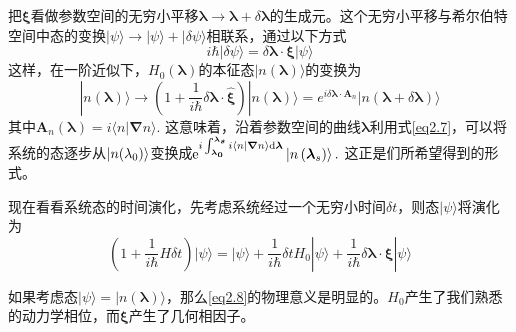 把$\boldsymbol{\xi}$看做参数空间的无穷小平移$\boldsymbol{\lambda} \to \boldsymbol{\lambda} + \delta \boldsymbol{\lambda}$的生成元。这个无穷小平移与希尔伯特空间中态的变换$|\psi\rangle \rightarrow|\psi\rangle+|\delta \psi\rangle$相联系，通过以下方式
\begin{equation}
    i \hbar|\delta \psi\rangle=\delta \boldsymbol{\lambda} \cdot \boldsymbol{\xi}|\psi\rangle
    \label{eq2.6}
\end{equation}
这样，在一阶近似下，$H_0 (\bm{\lambda})$的本征态$|n(\bm{\lambda})\rangle$的变换为
\begin{equation}
    |n(\boldsymbol{\lambda})\rangle \rightarrow\left(1+\frac{1}{i \hbar} \delta \boldsymbol{\lambda} \cdot \hat{\boldsymbol{\xi}}\right)|n(\boldsymbol{\lambda})\rangle=e^{i \delta \boldsymbol{\lambda} \cdot \boldsymbol{A}_{n}}|n(\boldsymbol{\lambda}+\delta \boldsymbol{\lambda})\rangle
    \label{eq2.7}
\end{equation}
其中$\boldsymbol{A}_{n}(\boldsymbol{\lambda})=i\langle n | \boldsymbol{\nabla} n\rangle.$ 这意味着，沿着参数空间的曲线$\bm{\lambda}$利用式\eqref{eq2.7}，可以将系统的态逐步从$|n(\mathrm{\lambda_0})\rangle$变换成$\mathrm{e}^{i \int_{\bm{\lambda_0}}^{\bm{\lambda_s}}   i\langle n | \boldsymbol{\nabla} n\rangle \mathrm{d}\bm{\lambda}}\left|n\left(\boldsymbol{\lambda}_{s}\right)\right\rangle.$ 这正是们所希望得到的形式。

现在看看系统态的时间演化，先考虑系统经过一个无穷小时间$\delta t$，则态$|\psi \rangle$将演化为
\begin{equation}
     \left(1+\frac{1}{i \hbar} H \delta t\right)|\psi\rangle=|\psi\rangle+\frac{1}{i \hbar} \delta t H_{0}|\psi\rangle+\frac{1}{i \hbar} \delta \boldsymbol{\lambda} \cdot \boldsymbol{\xi}|\psi\rangle
   \label{eq2.8}
\end{equation}

如果考虑态$|\psi \rangle = |n(\bm{\lambda}) \rangle$，那么\eqref{eq2.8}的物理意义是明显的。$H_0$产生了我们熟悉的动力学相位，而$\boldsymbol{\xi}$产生了几何相因子。

